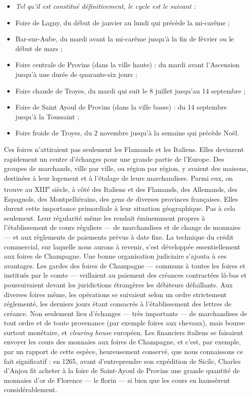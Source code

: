 \documentclass[french,twoside]{book} %
\newlength{\listmod}
\newcommand{\listhead}[1]{\hspace{-1\listmod}\emph{#1}}
\begin{document}
\begin{itemize}[itemsep=0pt,]
\item[]\listhead{Tel qu’il est constitué définitivement, le cycle est le suivant :}
\item Foire de Lagny, du début de janvier au lundi qui précède la mi-carême ;
\item Bar-sur-Aube, du mardi avant la mi-carême jusqu’à la fin de février ou le début de mars ;
\item Foire centrale de Provins (dans la ville haute) : du mardi avant l’Ascension jusqu’à une durée de quarante-six jours ;  
\label{p86}
\item {\term Foire chaude} de Troyes, du mardi qui suit le 8 juillet jusqu’au 14 septembre ;
\item {\term Foire de Saint Ayoul} de Provins (dans la ville basse) : du 14 septembre jusqu’à la Toussaint ;
\item {\term Foire froide} de Troyes, du 2 novembre jusqu’à la semaine qui précède Noël.
\end{itemize}
\noindent Ces foires n’attiraient pas seulement les Flamands et les Italiens. Elles devinrent rapidement un centre d’échanges pour une grande partie de l’Europe. Des groupes de marchands, ville par ville, ou région par région, y avaient des maisons, destinées à leur logement et à l’étalage de leurs marchandises. Parmi eux, on trouve au XIII\textsuperscript{e} siècle, à côté des Italiens et des Flamands, des Allemands, des Espagnols, des Montpelliérains, des gens de diverses provinces françaises. Elles durent cette importance primordiale à leur situation géographique. Pas à cela seulement. Leur régularité même les rendait éminemment propres à l’établissement de cours réguliers — de marchandises et de change de monnaies — et aux règlements de paiements prévus à date fixe. La technique du crédit commercial, sur laquelle nous aurons à revenir, s’est développée essentiellement aux foires de Champagne. Une bonne organisation judiciaire s’ajouta à ces avantages. Les {\term gardes des foires de Champagne} — communs à toutes les foires et institués par le comte — veillaient au paiement des créances contractées là-bas et poursuivaient devant les juridictions étrangères les débiteurs défaillants. Aux diverses foires même, les opérations se suivaient selon un ordre strictement réglementé, les derniers jours étant consacrés à l’établissement des lettres de créance. Non seulement lieu d’échanges — très importants — de marchandises de tout ordre et de toute provenance (par exemple foires aux chevaux), mais bourse surtout monétaire, et {\itshape clearing house} européen. Les financiers italiens se faisaient envoyer les cours des monnaies aux foires de Champagne, et c’est, par exemple, par un rapport de cette espèce, heureusement conservé, que nous connaissons ce fait significatif : en 1265, avant d’entreprendre son expédition de Sicile, Charles d’Anjou fit acheter à la foire de Saint-Ayoul de Provins une grande quantité de monnaies d’or de Florence — le florin — si bien que les cours en haussèrent considérablement.\par
\end{document}
